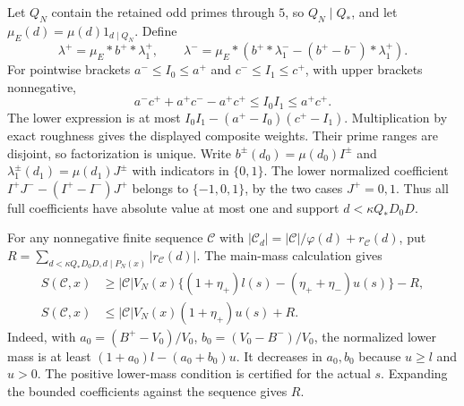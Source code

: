 \documentclass[11pt]{article}
\theoremstyle{remark}\newtheorem{remark}[theorem]{Remark}
\begin{document}
Let $Q_N$ contain the retained odd primes through $5$, so $Q_N\mid Q_*$,
and let $\mu_E(d)=\mu(d)1_{d\mid Q_N}$. Define
\[
\lambda^+=\mu_E*b^+*\lambda_1^+,\qquad
\lambda^-=\mu_E*(b^+*\lambda_1^--(b^+-b^-)*\lambda_1^+).
\]
For pointwise brackets $a^-\le I_0\le a^+$ and $c^-\le I_1\le c^+$,
with upper brackets nonnegative,
\[
a^-c^++a^+c^--a^+c^+\le I_0I_1\le a^+c^+.
\]
The lower expression is at most
$I_0I_1-(a^+-I_0)(c^+-I_1)$. Multiplication by exact roughness gives
the displayed composite weights.
Their prime ranges are disjoint, so factorization is unique.
Write $b^\pm(d_0)=\mu(d_0)I^\pm$ and
$\lambda_1^\pm(d_1)=\mu(d_1)J^\pm$ with indicators in $\{0,1\}$.
The lower normalized coefficient
$I^+J^--(I^+-I^-)J^+$ belongs to $\{-1,0,1\}$, by the two cases
$J^+=0,1$. Thus all full coefficients have absolute value at most one
and support $d<\kappa Q_*D_0D$.

For any nonnegative finite sequence $\mathcal C$ with
$|\mathcal C_d|=|\mathcal C|/\varphi(d)+r_{\mathcal C}(d)$,
put $R=\sum_{d<\kappa Q_*D_0D,d\mid P_N(x)}|r_{\mathcal C}(d)|$.
The main-mass calculation gives
\begin{equation}\label{eq:composite}
\begin{aligned}
S(\mathcal C,x)&\ge|\mathcal C|V_N(x)
\{(1+\eta_+)l(s)-(\eta_++\eta_-)u(s)\}-R,\\
S(\mathcal C,x)&\le|\mathcal C|V_N(x)(1+\eta_+)u(s)+R.
\end{aligned}
\end{equation}
Indeed, with $a_0=(B^+-V_0)/V_0$, $b_0=(V_0-B^-)/V_0$, the normalized
lower mass is at least $(1+a_0)l-(a_0+b_0)u$.
It decreases in $a_0,b_0$ because $u\ge l$ and $u>0$.
The positive lower-mass condition is certified for the actual $s$.
Expanding the bounded coefficients against the sequence gives $R$.
\end{document}
